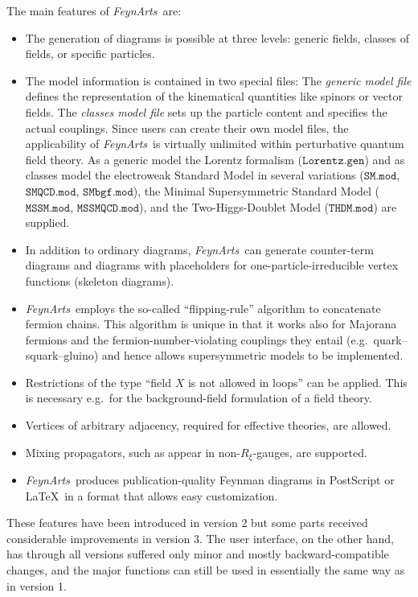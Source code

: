 \documentclass[twoside,12pt]{article}
\def\FA{\textit{FeynArts}}
\def\eg{e.g.\ }
\def\Code#1{\ensuremath{\texttt{#1}}}
\begin{document}
The main features of \FA\ are:
\begin{itemize}
\item
The generation of diagrams is possible at three levels: generic fields,
classes of fields, or specific particles.

\item
The model information is contained in two special files:
The \emph{generic model file} defines the representation of the
kinematical quantities like spinors or vector fields.  The \emph{classes
model file} sets up the particle content and specifies the actual
couplings.  Since users can create their own model files, the applicability
of \FA\ is virtually unlimited within perturbative quantum field
theory.  As a generic model the Lorentz formalism (\Code{Lorentz.gen}) and 
as classes model the electroweak Standard Model in several variations 
(\Code{SM.mod}, \Code{SMQCD.mod}, \Code{SMbgf.mod}), the Minimal 
Supersymmetric Standard Model (\Code{MSSM.mod}, \Code{MSSMQCD.mod}), and
the Two-Higgs-Doublet Model (\Code{THDM.mod}) are supplied.

\item
In addition to ordinary diagrams, \FA\ can generate counter-term diagrams
and diagrams with placeholders for one-particle-irreducible vertex
functions (skeleton diagrams).

\item
\FA\ employs the so-called ``flipping-rule'' algorithm \cite{DeEHK92} to
concatenate fermion chains.  This algorithm is unique in that it works
also for Majorana fermions and the fermion-number-violating couplings they
entail (\eg quark--squark--gluino) and hence allows supersymmetric models
to be implemented.

\item
Restrictions of the type ``field $X$ is not allowed in loops'' can be
applied.  This is necessary \eg for the background-field formulation of a
field theory.

\item
Vertices of arbitrary adjacency, required for effective theories, are
allowed.

\item
Mixing propagators, such as appear in non-$R_\xi$-gauges, are supported.

\item
\FA\ produces publication-quality Feynman diagrams in PostScript or
\LaTeX\ in a format that allows easy customization.
\end{itemize}
These features have been introduced in version 2 but some parts received 
considerable improvements in version 3.  The user interface, on the other 
hand, has through all versions suffered only minor and mostly 
backward-compatible changes, and the major functions can still be used in 
essentially the same way as in version 1.
\end{document}
